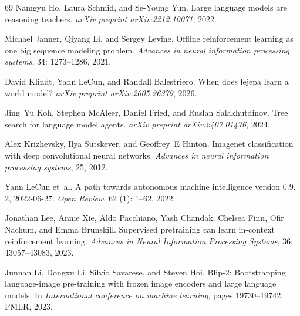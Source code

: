 \begin{thebibliography}{69}
Namgyu Ho, Laura Schmid, and Se-Young Yun.
\newblock Large language models are reasoning teachers.
\newblock \emph{arXiv preprint arXiv:2212.10071}, 2022.

Michael Janner, Qiyang Li, and Sergey Levine.
\newblock Offline reinforcement learning as one big sequence modeling problem.
\newblock \emph{Advances in neural information processing systems}, 34: 1273--1286, 2021.

David Klindt, Yann LeCun, and Randall Balestriero.
\newblock When does lejepa learn a world model?
\newblock \emph{arXiv preprint arXiv:2605.26379}, 2026.

Jing~Yu Koh, Stephen McAleer, Daniel Fried, and Ruslan Salakhutdinov.
\newblock Tree search for language model agents.
\newblock \emph{arXiv preprint arXiv:2407.01476}, 2024.

Alex Krizhevsky, Ilya Sutskever, and Geoffrey~E Hinton.
\newblock Imagenet classification with deep convolutional neural networks.
\newblock \emph{Advances in neural information processing systems}, 25, 2012.

Yann LeCun et~al.
\newblock A path towards autonomous machine intelligence version 0.9. 2, 2022-06-27.
\newblock \emph{Open Review}, 62 (1): 1--62, 2022.

Jonathan Lee, Annie Xie, Aldo Pacchiano, Yash Chandak, Chelsea Finn, Ofir Nachum, and Emma Brunskill.
\newblock Supervised pretraining can learn in-context reinforcement learning.
\newblock \emph{Advances in Neural Information Processing Systems}, 36: 43057--43083, 2023.

Junnan Li, Dongxu Li, Silvio Savarese, and Steven Hoi.
\newblock Blip-2: Bootstrapping language-image pre-training with frozen image encoders and large language models.
\newblock In \emph{International conference on machine learning}, pages 19730--19742. PMLR, 2023.


\end{thebibliography}
